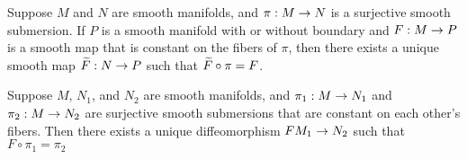 \begin{thm}
Suppose $M$ and $N$ are smooth manifolds, and $\pi:M\rightarrow N$ is a surjective smooth submersion. If $P$ is a smooth manifold with or without boundary and $F:M\rightarrow P$ is a smooth map that is constant on the fibers of $\pi$, then there exists a unique smooth map $\widetilde F:N\rightarrow P$ such that $\widetilde F\circ \pi = F$.
\end{thm}

\begin{thm}
Suppose $M$, $N_1$, and $N_2$ are smooth manifolds, and $\pi_1:M\rightarrow N_1$ and $\pi_2:M\rightarrow N_2$ are surjective smooth submersions that are constant on each other's fibers. Then there exists a unique diffeomorphism $FM_1\rightarrow N_2$ such that $F\circ \pi_1 = \pi_2$
\begin{center}
\end{center}
\end{thm}